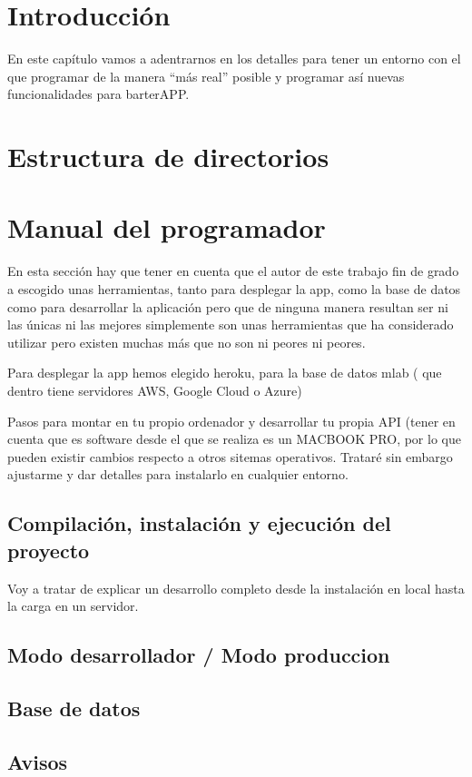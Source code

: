 
\section{Introducción}\label{introduccion-programador}
En este capítulo vamos a adentrarnos en los detalles para tener un entorno con el que programar de la manera “más real” posible y programar así nuevas funcionalidades para barterAPP.

\section{Estructura de directorios}\label{directorios}

\section{Manual del programador}
En esta sección hay que tener en cuenta que el autor de este trabajo fin de grado a escogido unas herramientas, tanto para desplegar la app, como la base de datos como para desarrollar la aplicación pero que de ninguna manera resultan ser ni las únicas ni las mejores simplemente son unas herramientas que ha considerado utilizar pero existen muchas más que no son ni peores ni peores. 

Para desplegar la app hemos elegido heroku, para la base de datos mlab ( que dentro tiene servidores AWS, Google Cloud o Azure)

Pasos para montar en tu propio ordenador y desarrollar tu propia API (tener en cuenta que es software desde el que se realiza es un MACBOOK PRO, por lo que pueden existir cambios respecto a otros sitemas operativos. Trataré sin embargo ajustarme y dar detalles para instalarlo en cualquier entorno.

\subsection{Compilación, instalación y ejecución del proyecto}
Voy a tratar de explicar un desarrollo completo desde la instalación en local hasta la carga en un servidor. 
\subsection{Modo desarrollador / Modo produccion}

\subsection{Base de datos}
\subsection{Avisos}


